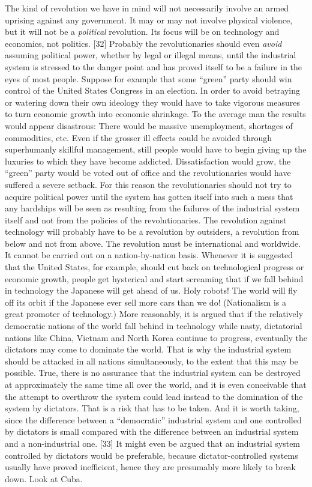  The kind of revolution we have in mind will not necessarily involve an armed uprising against any government. It may or may not involve physical violence, but it will not be a {\em political} revolution. Its focus will be on technology and economics, not politics. [32]
 Probably the revolutionaries should even {\em avoid} assuming political power, whether by legal or illegal means, until the industrial system is stressed to the danger point and has proved itself to be a failure in the eyes of most people. Suppose for example that some “green” party should win control of the United States Congress in an election. In order to avoid betraying or watering down their own ideology they would have to take vigorous measures to turn economic growth into economic shrinkage. To the average man the results would appear disastrous: There would be massive unemployment, shortages of commodities, etc. Even if the grosser ill effects could be avoided through superhumanly skillful management, still people would have to begin giving up the luxuries to which they have become addicted. Dissatisfaction would grow, the “green” party would be voted out of office and the revolutionaries would have suffered a severe setback. For this reason the revolutionaries should not try to acquire political power until the system has gotten itself into such a mess that any hardships will be seen as resulting from the failures of the industrial system itself and not from the policies of the revolutionaries. The revolution against technology will probably have to be a revolution by outsiders, a revolution from below and not from above.
 The revolution must be international and worldwide. It cannot be carried out on a nation-by-nation basis. Whenever it is suggested that the United States, for example, should cut back on technological progress or economic growth, people get hysterical and start screaming that if we fall behind in technology the Japanese will get ahead of us. Holy robots! The world will fly off its orbit if the Japanese ever sell more cars than we do! (Nationalism is a great promoter of technology.) More reasonably, it is argued that if the relatively democratic nations of the world fall behind in technology while nasty, dictatorial nations like China, Vietnam and North Korea continue to progress, eventually the dictators may come to dominate the world. That is why the industrial system should be attacked in all nations simultaneously, to the extent that this may be possible. True, there is no assurance that the industrial system can be destroyed at approximately the same time all over the world, and it is even conceivable that the attempt to overthrow the system could lead instead to the domination of the system by dictators. That is a risk that has to be taken. And it is worth taking, since the difference between a “democratic” industrial system and one controlled by dictators is small compared with the difference between an industrial system and a non-industrial one. [33] It might even be argued that an industrial system controlled by dictators would be preferable, because dictator-controlled systems usually have proved inefficient, hence they are presumably more likely to break down. Look at Cuba.\break
